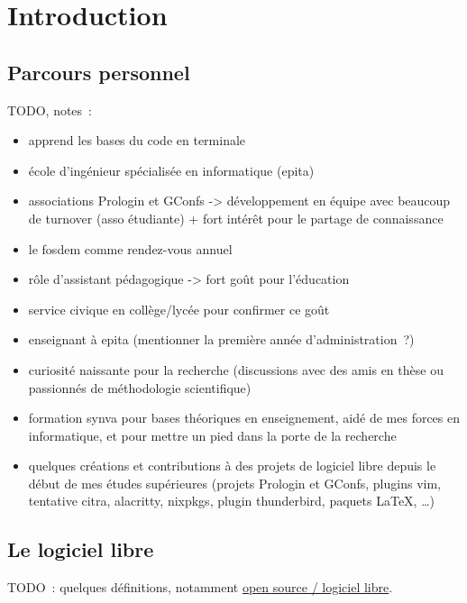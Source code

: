 \chapter{Introduction}

\section{Parcours personnel}

TODO, notes :

\begin{itemize}
    \item apprend les bases du code en terminale
    \item école d'ingénieur spécialisée en informatique (\gls{epita})
    \item associations Prologin et GConfs -> développement en équipe avec beaucoup de turnover (asso
        étudiante) + fort intérêt pour le partage de connaissance
    \item le \gls{fosdem} comme rendez-vous annuel
    \item rôle d'assistant pédagogique -> fort goût pour l'éducation
    \item service civique en collège/lycée pour confirmer ce goût
    \item enseignant à \gls{epita} (mentionner la première année d'administration ?)
    \item curiosité naissante pour la recherche (discussions avec des amis en thèse ou passionnés de
        méthodologie scientifique)
    \item formation \gls{synva} pour bases théoriques en enseignement, aidé de mes forces en informatique, et pour
        mettre un pied dans la porte de la recherche
    \item quelques créations et contributions à des projets de logiciel libre depuis le début de mes études
        supérieures (projets Prologin et GConfs, plugins vim, tentative citra, alacritty, nixpkgs, plugin
        thunderbird, paquets \LaTeX, \ldots)
\end{itemize}

\section{Le logiciel libre}

TODO : quelques définitions, notamment \href{https://opensource.org/osd}{open source / logiciel libre}.
